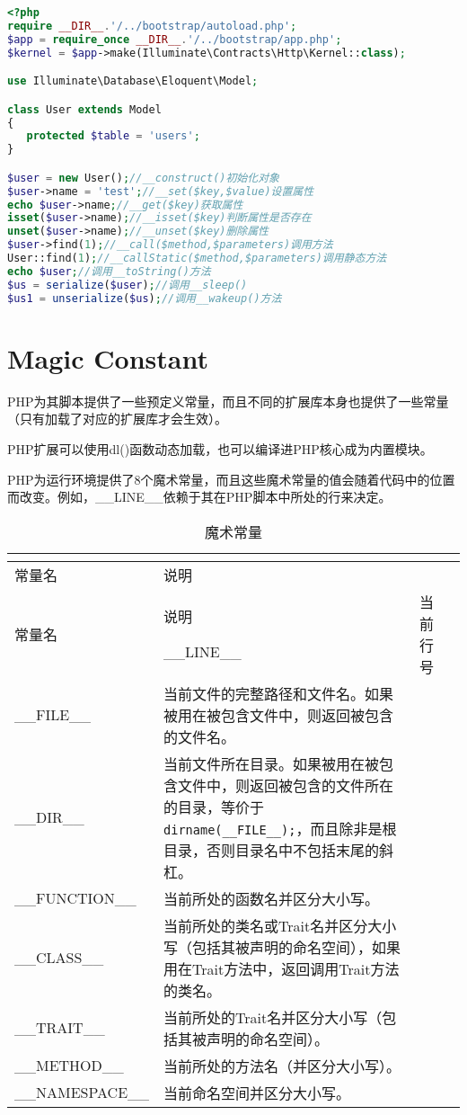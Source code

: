 \begin{lstlisting}[language=PHP]
<?php
require __DIR__.'/../bootstrap/autoload.php';
$app = require_once __DIR__.'/../bootstrap/app.php';
$kernel = $app->make(Illuminate\Contracts\Http\Kernel::class);

use Illuminate\Database\Eloquent\Model;

class User extends Model
{
   protected $table = 'users';
}

$user = new User();//__construct()初始化对象
$user->name = 'test';//__set($key,$value)设置属性
echo $user->name;//__get($key)获取属性
isset($user->name);//__isset($key)判断属性是否存在
unset($user->name);//__unset($key)删除属性
$user->find(1);//__call($method,$parameters)调用方法
User::find(1);//__callStatic($method,$parameters)调用静态方法
echo $user;//调用__toString()方法
$us = serialize($user);//调用__sleep()
$us1 = unserialize($us);//调用__wakeup()方法
\end{lstlisting}

\section{Magic Constant}

PHP为其脚本提供了一些预定义常量，而且不同的扩展库本身也提供了一些常量（只有加载了对应的扩展库才会生效）。

PHP扩展可以使用dl()函数动态加载，也可以编译进PHP核心成为内置模块。

PHP为运行环境提供了8个魔术常量，而且这些魔术常量的值会随着代码中的位置而改变。例如，\_\_LINE\_\_依赖于其在PHP脚本中所处的行来决定。



\begin{longtable}{|m{60pt}|m{200pt}|}
\tabularnewline\hline
常量名&说明
\endhead

\caption{魔术常量}\\
\hline
常量名&说明
\endfirsthead

\endfoot

\endlastfoot
\hline
\_\_LINE\_\_&当前行号\\
\hline
\_\_FILE\_\_&当前文件的完整路径和文件名。如果被用在被包含文件中，则返回被包含的文件名。\\
\hline
\_\_DIR\_\_&当前文件所在目录。如果被用在被包含文件中，则返回被包含的文件所在的目录，等价于\texttt{dirname(\_\_FILE\_\_);}，而且除非是根目录，否则目录名中不包括末尾的斜杠。\\
\hline
\_\_FUNCTION\_\_&当前所处的函数名并区分大小写。\\
\hline
\_\_CLASS\_\_&当前所处的类名或Trait名并区分大小写（包括其被声明的命名空间），如果用在Trait方法中，返回调用Trait方法的类名。\\
\hline
\_\_TRAIT\_\_&当前所处的Trait名并区分大小写（包括其被声明的命名空间）。\\
\hline
\_\_METHOD\_\_&当前所处的方法名（并区分大小写）。\\
\hline
\_\_NAMESPACE\_\_&当前命名空间并区分大小写。\\
\hline
\end{longtable}

